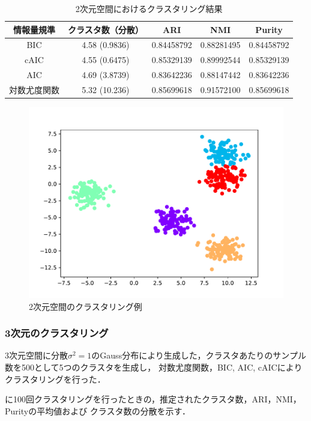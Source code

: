 \begin{table}[htb]
  \centering
  \caption{2次元空間におけるクラスタリング結果}
  \label{table:2dim}
  \begin{tabular}{|c|c|c|c|c|} \hline
    情報量規準 & クラスタ数（分散） & ARI & NMI & Purity \\\hline
    BIC & 4.58 (0.9836) & 0.84458792 & 0.88281495 & 0.84458792\\
    cAIC & 4.55 (0.6475) & 0.85329139 & 0.89992544 & 0.85329139\\
    AIC & 4.69 (3.8739) & 0.83642236 & 0.88147442 & 0.83642236\\
    対数尤度関数 & 5.32 (10.236) & 0.85699618 & 0.91572100 & 0.85699618\\\hline 
  \end{tabular}
\end{table}

\begin{figure}[htbp]
  \begin{center}
    \includegraphics[width=0.7\linewidth]{./img/BIC_2.pdf}
    \caption{2次元空間のクラスタリング例}
    \label{fig:2dim}
  \end{center}
\end{figure}

\subsubsection{3次元のクラスタリング}

3次元空間に分散$\sigma^2=1$のGauss分布により生成した，クラスタあたりのサンプル数を500として5つのクラスタを生成し，
対数尤度関数，BIC, AIC, cAICによりクラスタリングを行った．

に100回クラスタリングを行ったときの，推定されたクラスタ数，ARI，NMI，Purityの平均値および
クラスタ数の分散を示す．

